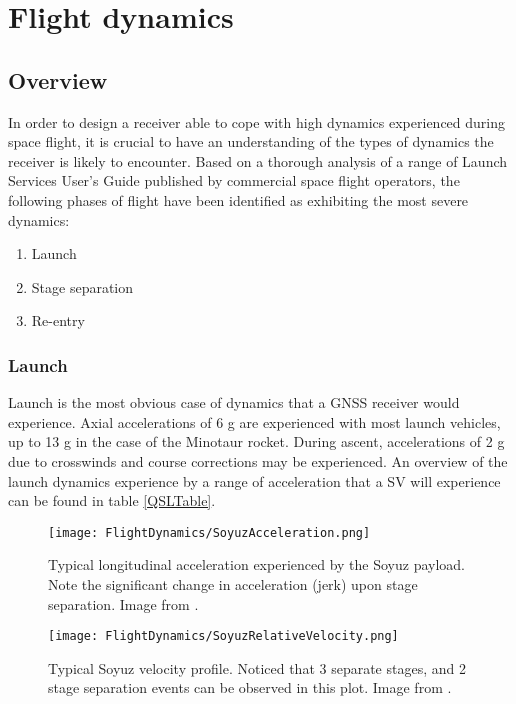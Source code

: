 \chapter{Flight dynamics}
\label{ch:FlightDynamics}

\section{Overview}
In order to design a receiver able to cope with high dynamics experienced during space flight, it is crucial to have an understanding of the types of dynamics the receiver is likely to encounter. Based on a thorough analysis of a range of Launch Services User's Guide published by commercial space flight operators, the following phases of flight have been identified as exhibiting the most severe dynamics: 

\begin{enumerate}
\item{Launch}
\item{Stage separation}
\item{Re-entry}
\end{enumerate}

\subsection{Launch}
Launch is the most obvious case of dynamics that a \ac{GNSS} receiver would experience. Axial accelerations of 6 g are experienced with most launch vehicles, up to 13 g in the case of the Minotaur rocket. During ascent, accelerations of 2 g due to crosswinds and course corrections may be experienced. An overview of the launch dynamics experience by a range of acceleration that a \ac{SV} will experience can be found in table \ref{QSLTable}.

\begin{figure}[!htb] 
    \centering
    \texttt{[image: FlightDynamics/SoyuzAcceleration.png]} 
    \caption{Typical longitudinal acceleration experienced by the Soyuz payload. Note the significant change in acceleration (jerk) upon stage separation. Image from \cite{Soyuz}.}
    \label{fig:SoyuzAcceleration}
\end{figure}

\begin{figure}[!htb] 
    \centering
    \texttt{[image: FlightDynamics/SoyuzRelativeVelocity.png]} 
    \caption{Typical Soyuz velocity profile. Noticed that 3 separate stages, and 2 stage separation events can be observed in this plot. Image from \cite{Soyuz}.}
    \label{fig:SoyuzRelativeVelocity}
\end{figure}


